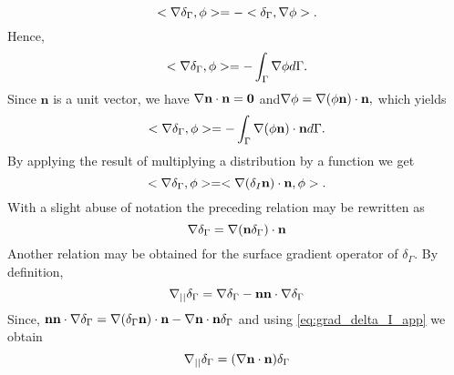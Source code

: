 \documentclass[11pt]{My_preprint}
\begin{document}
\begin{equation}
<\mathbf{\nabla} \delta_\Gamma,\phi> = - <\delta_\Gamma,\mathbf{\nabla} \phi>.
\end{equation}
Hence,
\begin{equation}
<\grad \delta_\Gamma,\phi> = - \int_{\Gamma} \grad \phi d\Gamma.
\label{eq:1grad_delta_I}
\end{equation}
Since $\textbf{n}$ is a unit vector, we have $\mathbf{\nabla}  \textbf{n} \cdot \textbf{n} =\bm 0$ and$\mathbf{\nabla} \phi= \mathbf{\nabla}  (\phi \textbf{n}) \cdot \textbf{n},$
which yields 
\begin{equation}
<\mathbf{\nabla} \delta_\Gamma,\phi> = - \int_{\Gamma} \mathbf{\nabla}  (\phi \textbf{n}) \cdot \textbf{n} d\Gamma. 
\end{equation}
By applying the result of multiplying a distribution by a function we get \citep{appel2007} \begin{equation}
<\mathbf{\nabla} \delta_\Gamma,\phi> = <\mathbf{\nabla}  (\delta _I \textbf{n}) \cdot \textbf{n},\phi>.
\end{equation}
With a slight abuse of notation the preceding relation may be rewritten as
\begin{equation}
    \grad\delta_\Gamma 
    =   \grad  (\textbf{n} \delta_\Gamma) \cdot \textbf{n}
    \label{eq:grad_delta_I_app}
\end{equation}
Another relation may be obtained for the surface gradient operator of $\delta_\Gamma$. By definition,
\begin{equation}
  \mathbf{\nabla}_{||} \delta_\Gamma  = \mathbf{\nabla}\delta_\Gamma - \textbf{nn}\cdot\mathbf{\nabla}\delta_\Gamma
\end{equation}
Since, $\textbf{nn}\cdot\mathbf{\nabla}\delta_\Gamma = \mathbf{\nabla}  (\delta_\Gamma\textbf{n})\cdot \textbf{n}-\mathbf{\nabla} \textbf{n}\cdot \textbf{n} \delta_\Gamma$ and using \ref{eq:grad_delta_I_app} we obtain
\begin{equation}
  \gradI \delta_\Gamma  = (\grad \textbf{n}\cdot \textbf{n}) \delta_\Gamma
\label{eq:gradI_deltaI}
\end{equation}
\end{document}
